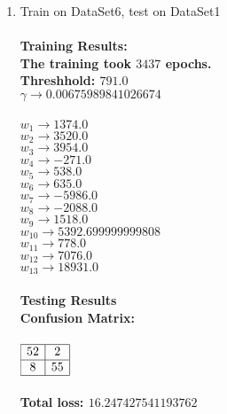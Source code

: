 \begin{enumerate}
\begin{enumerate}
				\item{Train on DataSet6, test on DataSet1} \\ \\
					\bf{Training Results: } \\
						\textnormal{The training took } \(3437\) \textnormal{ epochs. } \\
						\textnormal{Threshhold:} \( 791.0 \) \\
						\( \gamma \rightarrow 0.00675989841026674 \) \\ \\
						\( w_{1} \rightarrow 1374.0 \) \\
						\( w_{2} \rightarrow 3520.0 \) \\
						\( w_{3} \rightarrow 3954.0 \) \\
						\( w_{4} \rightarrow -271.0 \) \\
						\( w_{5} \rightarrow 538.0 \) \\
						\( w_{6} \rightarrow 635.0 \) \\
						\( w_{7} \rightarrow -5986.0 \) \\
						\( w_{8} \rightarrow -2088.0 \) \\
						\( w_{9} \rightarrow 1518.0 \) \\
						\( w_{10} \rightarrow 5392.699999999808 \) \\
						\( w_{11} \rightarrow 778.0 \) \\
						\( w_{12} \rightarrow 7076.0 \) \\
						\( w_{13} \rightarrow 18931.0 \) \\ \\
					\bf{Testing Results} \\
					\textnormal{Confusion Matrix: } \\ \\
					\( 
						\begin{array}{|c|c|}
							\hline
							52 & 2 \\
							\hline							
							8 & 55 \\
							\hline
						\end{array}
					\) \\ \\
					Total loss: \(16.247427541193762\) \\ \\


\end{enumerate}
\end{enumerate}
